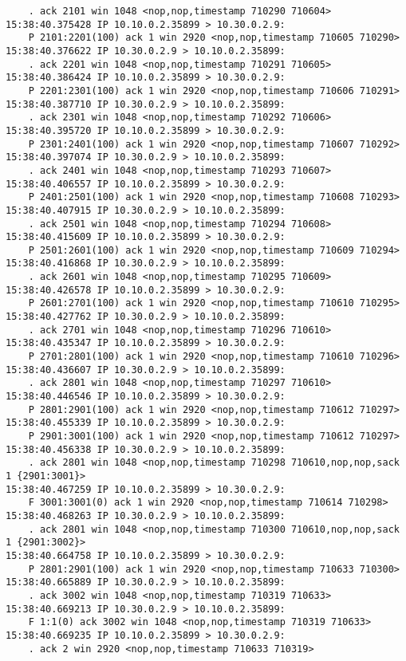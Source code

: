\documentclass[a4paper,12pt]{article}
\begin{document}
\begin{Verbatim}
    . ack 2101 win 1048 <nop,nop,timestamp 710290 710604>
15:38:40.375428 IP 10.10.0.2.35899 > 10.30.0.2.9: 
    P 2101:2201(100) ack 1 win 2920 <nop,nop,timestamp 710605 710290>
15:38:40.376622 IP 10.30.0.2.9 > 10.10.0.2.35899: 
    . ack 2201 win 1048 <nop,nop,timestamp 710291 710605>
15:38:40.386424 IP 10.10.0.2.35899 > 10.30.0.2.9: 
    P 2201:2301(100) ack 1 win 2920 <nop,nop,timestamp 710606 710291>
15:38:40.387710 IP 10.30.0.2.9 > 10.10.0.2.35899: 
    . ack 2301 win 1048 <nop,nop,timestamp 710292 710606>
15:38:40.395720 IP 10.10.0.2.35899 > 10.30.0.2.9: 
    P 2301:2401(100) ack 1 win 2920 <nop,nop,timestamp 710607 710292>
15:38:40.397074 IP 10.30.0.2.9 > 10.10.0.2.35899: 
    . ack 2401 win 1048 <nop,nop,timestamp 710293 710607>
15:38:40.406557 IP 10.10.0.2.35899 > 10.30.0.2.9: 
    P 2401:2501(100) ack 1 win 2920 <nop,nop,timestamp 710608 710293>
15:38:40.407915 IP 10.30.0.2.9 > 10.10.0.2.35899: 
    . ack 2501 win 1048 <nop,nop,timestamp 710294 710608>
15:38:40.415609 IP 10.10.0.2.35899 > 10.30.0.2.9: 
    P 2501:2601(100) ack 1 win 2920 <nop,nop,timestamp 710609 710294>
15:38:40.416868 IP 10.30.0.2.9 > 10.10.0.2.35899: 
    . ack 2601 win 1048 <nop,nop,timestamp 710295 710609>
15:38:40.426578 IP 10.10.0.2.35899 > 10.30.0.2.9: 
    P 2601:2701(100) ack 1 win 2920 <nop,nop,timestamp 710610 710295>
15:38:40.427762 IP 10.30.0.2.9 > 10.10.0.2.35899: 
    . ack 2701 win 1048 <nop,nop,timestamp 710296 710610>
15:38:40.435347 IP 10.10.0.2.35899 > 10.30.0.2.9: 
    P 2701:2801(100) ack 1 win 2920 <nop,nop,timestamp 710610 710296>
15:38:40.436607 IP 10.30.0.2.9 > 10.10.0.2.35899: 
    . ack 2801 win 1048 <nop,nop,timestamp 710297 710610>
15:38:40.446546 IP 10.10.0.2.35899 > 10.30.0.2.9: 
    P 2801:2901(100) ack 1 win 2920 <nop,nop,timestamp 710612 710297>
15:38:40.455339 IP 10.10.0.2.35899 > 10.30.0.2.9: 
    P 2901:3001(100) ack 1 win 2920 <nop,nop,timestamp 710612 710297>
15:38:40.456338 IP 10.30.0.2.9 > 10.10.0.2.35899: 
    . ack 2801 win 1048 <nop,nop,timestamp 710298 710610,nop,nop,sack 1 {2901:3001}>
15:38:40.467259 IP 10.10.0.2.35899 > 10.30.0.2.9: 
    F 3001:3001(0) ack 1 win 2920 <nop,nop,timestamp 710614 710298>
15:38:40.468263 IP 10.30.0.2.9 > 10.10.0.2.35899: 
    . ack 2801 win 1048 <nop,nop,timestamp 710300 710610,nop,nop,sack 1 {2901:3002}>
15:38:40.664758 IP 10.10.0.2.35899 > 10.30.0.2.9: 
    P 2801:2901(100) ack 1 win 2920 <nop,nop,timestamp 710633 710300>
15:38:40.665889 IP 10.30.0.2.9 > 10.10.0.2.35899: 
    . ack 3002 win 1048 <nop,nop,timestamp 710319 710633>
15:38:40.669213 IP 10.30.0.2.9 > 10.10.0.2.35899: 
    F 1:1(0) ack 3002 win 1048 <nop,nop,timestamp 710319 710633>
15:38:40.669235 IP 10.10.0.2.35899 > 10.30.0.2.9: 
    . ack 2 win 2920 <nop,nop,timestamp 710633 710319>
\end{Verbatim}
\end{document}
